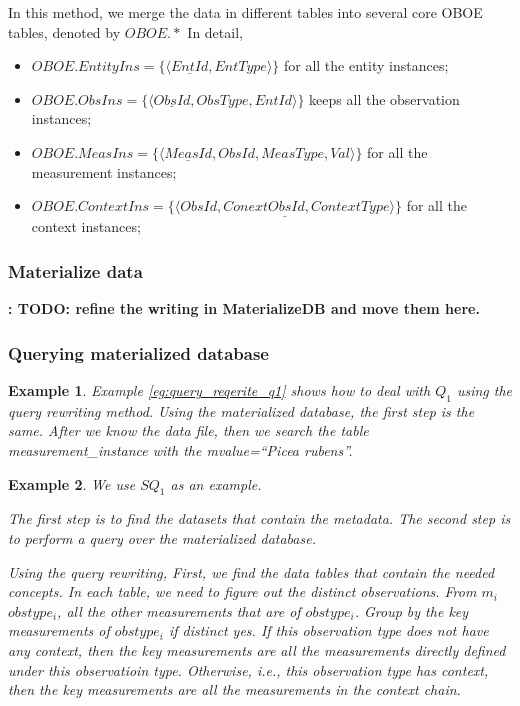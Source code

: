 \documentclass[conference]{IEEEtran}
\newtheorem{example}{Example}[section]
\begin{document}
In this method, we merge the data in different tables into several
core OBOE tables, denoted by $OBOE.*$
In detail,
\begin{itemize}
\item $OBOE.EntityIns=\{\langle \underline{EntId}, EntType\rangle\}$ for all the entity instances;
\item $OBOE.ObsIns=\{\langle \underline{ObsId}, ObsType, EntId \rangle\}$ keeps all the observation instances;
\item $OBOE.MeasIns=\{\langle \underline{MeasId}, ObsId, MeasType, Val\rangle\}$ for all the measurement instances;
\item $OBOE.ContextIns =\{\langle \underline{ObsId, ConextObsId, ContextType}\rangle\}$ for all the context instances;
\end{itemize}

\subsubsection{Materialize data}
{\bf: TODO: refine the writing in MaterializeDB and move them here.}

\subsubsection{Querying materialized database}

\begin{example} \label{eg:materialize_db_q1}
Example \ref{eg:query_reqerite_q1} shows how to deal with $Q_1$ using
the query rewriting method. 
Using the  materialized database, the first step is the same.
After we know the data file, then we search the table {\em measurement\_instance} with the {\em mvalue=``Picea rubens''}. 
\end{example}

\begin{example}
We use $SQ_1$ as an example. 

The first step is to find the datasets that contain the metadata. 
The second step is to perform a query over the materialized database. 

Using the query rewriting, 
First, we find the data tables that contain the needed concepts. 
In each table, we need to figure out the distinct observations. 
From $m_i$ $obstype_i$, all the other measurements that are of
$obstype_i$. 
Group by the key measurements of $obstype_i$ if distinct yes.
If this observation type does not have any context, then the key
measurements are all the measurements directly defined under this
observatioin type. Otherwise, i.e., this observation type has context,
then the key measurements are all the measurements in the context
chain. 
\end{example}
\end{document}
